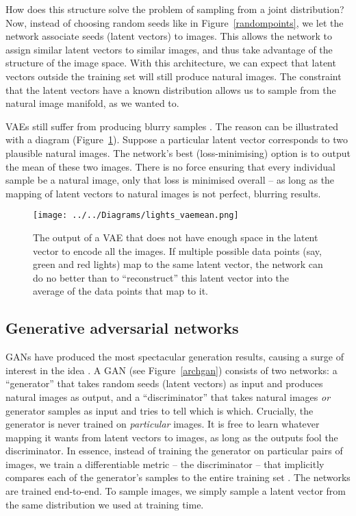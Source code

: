 \documentclass[11pt, a4paper, openany]{book}
\newcommand{\nquote}[1]{``{#1}''}
\begin{document}
How does this structure solve the problem of sampling from a joint distribution? Now, instead of choosing random seeds like in Figure~\ref{randompoints}, we let the network associate seeds (latent vectors) to images. This allows the network to assign similar latent vectors to similar images, and thus take advantage of the structure of the image space. With this architecture, we can expect that latent vectors outside the training set will still produce natural images. The constraint that the latent vectors have a known distribution allows us to sample from the natural image manifold, as we wanted to.

VAEs still suffer from producing blurry samples \citep{vaeunderstanding}. The reason can be illustrated with a diagram (Figure~\ref{vaemean}). Suppose a particular latent vector corresponds to two plausible natural images. The network's best (loss-minimising) option is to output the mean of these two images. There is no force ensuring that every individual sample be a natural image, only that loss is minimised overall -- as long as the mapping of latent vectors to natural images is not perfect, blurring results.

\begin{figure}
  \centering
  \texttt{[image: ../../Diagrams/lights\_vaemean.png]}
  \caption[Output of a VAE]{The output of a VAE that does not have enough space in the latent vector to encode all the images. If multiple possible data points (say, green and red lights) map to the same latent vector, the network can do no better than to \nquote{reconstruct} this latent vector into the average of the data points that map to it.}
  \label{vaemean}
\end{figure}

\subsection{Generative adversarial networks}

GANs \citep{gan} have produced the most spectacular generation results, causing a surge of interest in the idea \citep{imagefromcaption,unsupervisedgan,structurestylegan,texttoimagegan,imagetoimagegan,progressivegrowing}. A GAN (see Figure~\ref{archgan}) consists of two networks: a \nquote{generator} that takes random seeds (latent vectors) as input and produces natural images as output, and a \nquote{discriminator} that takes natural images \emph{or} generator samples as input and tries to tell which is which. Crucially, the generator is never trained on \emph{particular} images. It is free to learn whatever mapping it wants from latent vectors to images, as long as the outputs fool the discriminator. In essence, instead of training the generator on particular pairs of images, we train a differentiable metric -- the discriminator -- that implicitly compares each of the generator's samples to the entire training set \citep{wgan}. The networks are trained end-to-end. To sample images, we simply sample a latent vector from the same distribution we used at training time.
\end{document}

